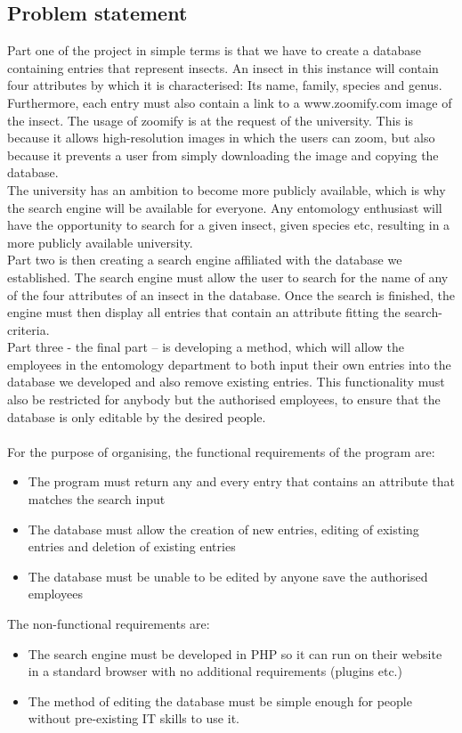\documentclass[12pt,a4paper]{article}
\begin{document}
\subsection{Problem statement}
Part one of the project in simple terms is that we have to create a database containing entries that represent insects. An insect in this instance will contain four attributes by which it is characterised: Its name, family, species and genus. Furthermore, each entry must also contain a link to a www.zoomify.com image of the insect. The usage of zoomify is at the request of the university. This is because it allows high-resolution images in which the users can zoom, but also because it prevents a user from simply downloading the image and copying the database. \\
The university has an ambition to become more publicly available, which is why the search engine will be available for everyone. Any entomology enthusiast will have the opportunity to search for a given insect, given species etc, resulting in a more publicly available university.\\
Part two is then creating a search engine affiliated with the database we established. The search engine must allow the user to search for the name of any of the four attributes of an insect in the database. Once the search is finished, the engine must then display all entries that contain an attribute fitting the search-criteria.\\
Part three - the final part – is developing a method, which will allow the employees in the entomology department to both input their own entries into the database we developed and also remove existing entries. This functionality must also be restricted for anybody but the authorised employees, to ensure that the database is only editable by the desired people.\\\\
For the purpose of organising, the functional requirements of the program are:
\begin{itemize}
	\item The program must return any and every entry that contains an attribute that matches the search input
	\item The database must allow the creation of new entries, editing of existing entries and deletion of existing entries
	\item The database must be unable to be edited by anyone save the authorised employees
\end{itemize}
	The non-functional requirements are:\\
\begin{itemize}
	\item The search engine must be developed in PHP so it can run on their website in a standard browser with no additional requirements (plugins etc.)
	\item The method of editing the database must be simple enough for people without pre-existing IT skills to use it.
\end{itemize}
\end{document}
